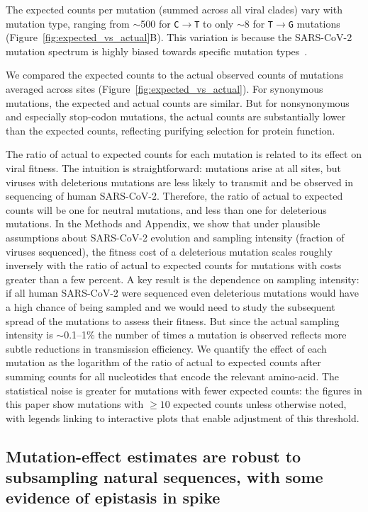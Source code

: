 \documentclass[9pt,twocolumn,twoside]{gsajnl_modified}
\begin{document}
The expected counts per mutation (summed across all viral clades) vary with mutation type, ranging from $\sim$500 for \texttt{C$\rightarrow$T} to only $\sim$8 for \texttt{T$\rightarrow$G} mutations (Figure~\ref{fig:expected_vs_actual}B).
This variation is because the SARS-CoV-2 mutation spectrum is highly biased towards specific mutation types~\citep{bloom2022evolution,ruis2022mutational,de2021mutation,neher2022contributions}.

We compared the expected counts to the actual observed counts of mutations averaged across sites (Figure~\ref{fig:expected_vs_actual}).
For synonymous mutations, the expected and actual counts are similar.
But for nonsynonymous and especially stop-codon mutations, the actual counts are substantially lower than the expected counts, reflecting purifying selection for protein function.

The ratio of actual to expected counts for each mutation is related to its effect on viral fitness.
The intuition is straightforward: mutations arise at all sites, but viruses with deleterious mutations are less likely to transmit and be observed in sequencing of human SARS-CoV-2.
Therefore, the ratio of actual to expected counts will be one for neutral mutations, and less than one for deleterious mutations.
In the Methods and Appendix, we show that under plausible assumptions about SARS-CoV-2 evolution and sampling intensity (fraction of viruses sequenced), the fitness cost of a deleterious mutation scales roughly inversely with the ratio of actual to expected counts for mutations with costs greater than a few percent.
A key result is the dependence on sampling intensity: if all human SARS-CoV-2 were sequenced even deleterious mutations would have a high chance of being sampled and we would need to study the subsequent spread of the mutations to assess their fitness.
But since the actual sampling intensity is $\sim$0.1--1\% the number of times a mutation is observed reflects more subtle reductions in transmission efficiency.
We quantify the effect of each mutation as the logarithm of the ratio of actual to expected counts after summing counts for all nucleotides that encode the relevant amino-acid.
The statistical noise is greater for mutations with fewer expected counts: the figures in this paper show mutations with $\ge10$ expected counts unless otherwise noted, with legends linking to interactive plots that enable adjustment of this threshold.

\subsection*{Mutation-effect estimates are robust to subsampling natural sequences, with some evidence of epistasis in spike}
\end{document}
